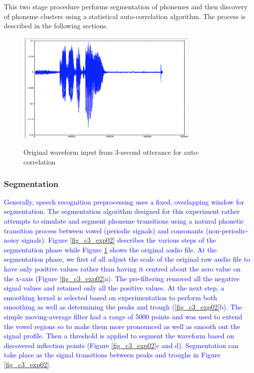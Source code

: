 This two stage procedure performs segmentation of phonemes and then discovery of phoneme clusters using a statistical auto-correlation algorithm.  The process is described in the following sections.
\begin{figure}
\centering
  \includegraphics[width=9cm]{thesis/images/corr}\\
  \caption{Original waveform input from 3-second utterance for auto-correlation}\label{fig_c3_exp01}
\end{figure}

\subsubsection{Segmentation}
\textcolor{blue}{Generally, speech recognition preprocessing uses a fixed, overlapping window for segmentation. The segmentation algorithm designed for this experiment rather attempts to simulate and segment phoneme transitions using a natural phonetic  transition process between vowel (periodic signals) and consonants (non-periodic-noisy signals). Figure \ref{fig_c3_exp02} describes the various steps of the segmentation phase while Figure \ref{fig_c3_exp01} shows the original audio file. At the segmentation phase, we first of all adjust the scale of the original raw audio file to have only positive values rather than having it centred about the zero value on the x-axis (Figure \ref{fig_c3_exp02}a).  The pre-filtering removed all the negative signal values and retained only all the positive values.  At the next step, a smoothing kernel is selected based on experimentation to perform both smoothing as well as determining the peaks and trough (\ref{fig_c3_exp02}b).   The simple moving-average filter had a range of 5000 points and was used to extend the vowel regions so to make them more pronounced as well as smooth out the signal profile.    Then a threshold is applied to segment the waveform based on discovered inflection points (Figure \ref{fig_c3_exp02}c and d).  Segmentation can take place as the signal transitions between peaks and troughs in Figure \ref{fig_c3_exp02}.}

